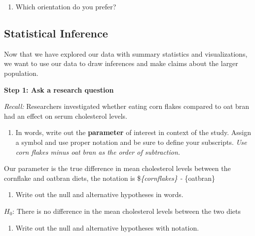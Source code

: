 \documentclass[
  letterpaper,
  DIV=11,
  numbers=noendperiod]{scrartcl}
\providecommand{\tightlist}{%
  \setlength{\itemsep}{0pt}\setlength{\parskip}{0pt}}\usepackage{longtable,booktabs,array}
\begin{document}
\vspace{0.8in}

\begin{enumerate}
\def\labelenumi{\arabic{enumi}.}
\setcounter{enumi}{11}
\tightlist
\item
  Which orientation do you prefer?
\end{enumerate}

\newpage

\hypertarget{statistical-inference}{%
\subsection{Statistical Inference}\label{statistical-inference}}

Now that we have explored our data with summary statistics and
visualizations, we want to use our data to draw inferences and make
claims about the larger population.

\textbf{Step 1: Ask a research question}

\emph{Recall:} Researchers investigated whether eating corn flakes
compared to oat bran had an effect on serum cholesterol levels.

\begin{enumerate}
\def\labelenumi{\arabic{enumi}.}
\setcounter{enumi}{12}
\tightlist
\item
  In words, write out the \textbf{parameter} of interest in context of
  the study. Assign a symbol and use proper notation and be sure to
  define your subscripts. \emph{Use corn flakes minus oat bran as the
  order of subtraction.}
\end{enumerate}

Our parameter is the true difference in mean cholesterol levels between
the cornflake and oatbran diets, the notation is
\$\mu\emph{\{cornflakes\} - \mu}\{oatbran\}

\begin{enumerate}
\def\labelenumi{\arabic{enumi}.}
\setcounter{enumi}{13}
\tightlist
\item
  Write out the null and alternative hypotheses in words.
\end{enumerate}

\(H_0\): There is no difference in the mean cholesterol levels between
the two diets

\begin{enumerate}
\def\labelenumi{\arabic{enumi}.}
\setcounter{enumi}{14}
\tightlist
\item
  Write out the null and alternative hypotheses with notation.
\end{enumerate}
\end{document}
